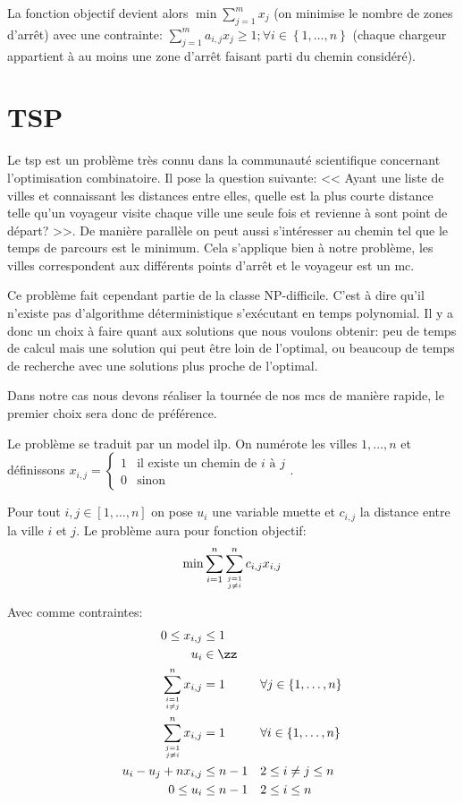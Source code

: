\documentclass[noposter,final]{polytech/polytech}
\begin{document}
		 La fonction objectif devient alors $\min\sum_{j=1}^mx_j$ (on minimise le nombre de zones d'arrêt) avec une contrainte: $\sum_{j=1}^ma_{i,j}x_j\geq 1; \forall i\in \left\{1, \dots ,n\right\}$ (chaque chargeur appartient à au moins une zone d'arrêt faisant parti du chemin considéré).
		 
	\section{TSP}
		Le \gls{tsp} \cite{wiki:tsp} est un problème très connu dans la communauté scientifique concernant l'optimisation combinatoire.
		Il pose la question suivante: << Ayant une liste de villes et connaissant les distances entre elles, quelle est la plus courte distance telle qu'un voyageur visite chaque ville une seule fois et revienne à sont point de départ? >>.
		De manière parallèle on peut aussi s'intéresser au chemin tel que le temps de parcours est le minimum.
		Cela s'applique bien à notre problème, les villes correspondent aux différents points d'arrêt et le voyageur est un \gls{mc}.
		
		Ce problème fait cependant partie de la classe NP-difficile.
		C'est à dire qu'il n'existe pas d'algorithme déterministique s'exécutant en temps polynomial.
		Il y a donc un choix à faire quant aux solutions que nous voulons obtenir: peu de temps de calcul mais une solution qui peut être loin de l'optimal, ou beaucoup de temps de recherche avec une solutions plus proche de l'optimal.
		
		Dans notre cas nous devons réaliser la tournée de nos \glspl{mc} de manière rapide, le premier choix sera donc de préférence.
		
		Le problème se traduit par un model \gls{ilp}.
		On numérote les villes $1, \dots, n$ et définissons $x_{i,j}=\left\{\begin{array}{ll}
				1 & \text{il existe un chemin de } i \text{ à }j\\
				0 & \text{sinon}
			\end{array}\right.$.
			
		Pour tout $i,j\in\left[1,\dots,n\right]$ on pose $u_i$ une variable muette et $c_{i,j}$ la distance entre la ville $i$ et $j$.
		Le problème aura pour fonction objectif:
		\begin{align}
			\label{eq:eq1}
			\min\sum_{i=1}^n\sum_{j=1\atop j\neq i}^n c_{i,j}x_{i,j}
		\end{align}
		
		Avec comme contraintes:
		\begin{align}
			\label{eq:eq2}
			0 \leq x_{i,j} &\leq 1 &&\\
			u_i&\in\zz &&\nonumber \\
			\label{eq:eq3}
			\sum_{i=1\atop i\neq j}^n x_{i,j} &= 1 && \forall j\in \left\{ 1, \dots , n\right\}\\
			\label{eq:eq4}
			\sum_{j=1\atop j\neq i}^n x_{i,j} &= 1 && \forall i\in \left\{ 1, \dots , n\right\}\\
			\label{eq:eq5}
			u_i-u_j+nx_{i,j}&\leq n-1 && 2\leq i\neq j\leq n \\
			\label{eq:eq6}
			0\leq u_i &\leq n-1 && 2\leq i\leq n
		\end{align}
		
\end{document}
